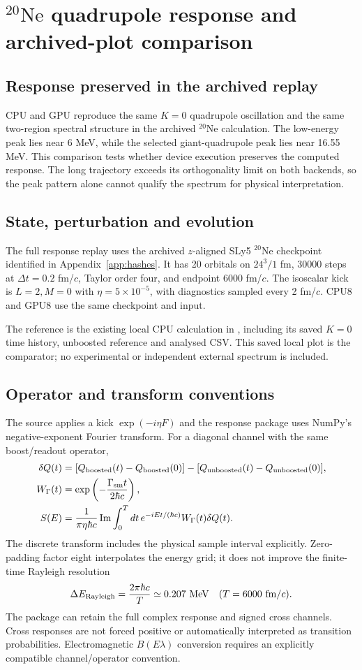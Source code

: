 \documentclass[11pt,a4paper]{article}
\newcommand{\Ne}{\texorpdfstring{\ensuremath{^{20}\mathrm{Ne}}}{20Ne}}
\newcommand{\sepsection}[1]{\FloatBarrier\section{#1}}
\begin{document}
\sepsection{\Ne{} quadrupole response and archived-plot comparison}
\label{sec:response}
\subsection{Response preserved in the archived replay}
CPU and GPU reproduce the same $K=0$ quadrupole oscillation and the same
two-region spectral structure in the archived \Ne{} calculation.
The low-energy peak lies near 6 MeV, while the selected giant-quadrupole
peak lies near 16.55 MeV. This comparison tests whether device execution
preserves the computed response. The long trajectory exceeds its
orthogonality limit on both backends, so the peak pattern alone cannot
qualify the spectrum for physical interpretation.

\subsection{State, perturbation and evolution}
The full response replay uses the archived $z$-aligned SLy5 \Ne{}
checkpoint identified in Appendix~\ref{app:hashes}. It has 20 orbitals on $24^3/1$ fm,
30000 steps at $\Delta t=0.2$ fm/$c$, Taylor order four, and endpoint
6000 fm/$c$. The isoscalar kick is $L=2,M=0$ with
$\eta=5\times10^{-5}$, with diagnostics sampled every 2 fm/$c$.
CPU8 and GPU8 use the same checkpoint and input.

The reference is the existing local CPU calculation in
, including its saved $K=0$
time history, unboosted reference and analysed CSV. This saved local plot is the comparator; no experimental or independent
external spectrum is included.

\subsection{Operator and transform conventions}
The source applies a kick $\exp(-i\eta F)$ and the response package uses
NumPy's negative-exponent Fourier transform. For a diagonal channel with
the same boost/readout operator,
\begin{align}
 \delta Q(t)&=[Q_{\rm boosted}(t)-Q_{\rm boosted}(0)]
             -[Q_{\rm unboosted}(t)-Q_{\rm unboosted}(0)],\\
 W_\Gamma(t)&=\exp\left(-\frac{\Gamma_{\rm sm}t}{2\hbar c}\right),\\
 S(E)&=\frac{1}{\pi\eta\hbar c}\operatorname{Im}
       \int_0^T dt\,e^{-iEt/(\hbar c)}W_\Gamma(t)\delta Q(t).
 \label{eq:strength}
\end{align}
The discrete transform includes the physical sample interval explicitly.
Zero-padding factor eight interpolates the energy grid; it does not improve
the finite-time Rayleigh resolution
\begin{equation}
 \Delta E_{\rm Rayleigh}=\frac{2\pi\hbar c}{T}
 \simeq0.207\ \mathrm{MeV}\quad(T=6000\ \mathrm{fm}/c).
\end{equation}
The package can retain the full complex response and signed cross channels.
Cross responses are not forced positive or automatically interpreted as
transition probabilities. Electromagnetic $B(E\lambda)$ conversion requires
an explicitly compatible channel/operator convention.
\end{document}
